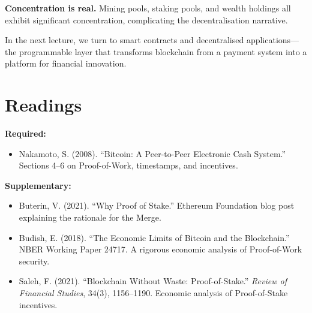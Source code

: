 \documentclass[11pt,a4paper]{article}
\begin{document}
\textbf{Concentration is real.} Mining pools, staking pools, and wealth holdings all exhibit significant concentration, complicating the decentralisation narrative.

In the next lecture, we turn to smart contracts and decentralised applications---the programmable layer that transforms blockchain from a payment system into a platform for financial innovation.

\section*{Readings}

\textbf{Required:}
\begin{itemize}
    \item Nakamoto, S. (2008). ``Bitcoin: A Peer-to-Peer Electronic Cash System.'' Sections 4--6 on Proof-of-Work, timestamps, and incentives.
\end{itemize}

\textbf{Supplementary:}
\begin{itemize}
    \item Buterin, V. (2021). ``Why Proof of Stake.'' Ethereum Foundation blog post explaining the rationale for the Merge.
    \item Budish, E. (2018). ``The Economic Limits of Bitcoin and the Blockchain.'' NBER Working Paper 24717. A rigorous economic analysis of Proof-of-Work security.
    \item Saleh, F. (2021). ``Blockchain Without Waste: Proof-of-Stake.'' \textit{Review of Financial Studies}, 34(3), 1156--1190. Economic analysis of Proof-of-Stake incentives.
\end{itemize}

\end{document}
